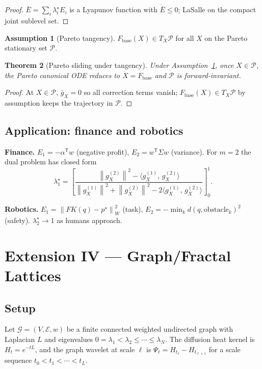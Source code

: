 \documentclass[11pt,a4paper]{article}
\newtheorem{theorem}{Theorem}[section]
\theoremstyle{definition}
\newtheorem{assumption}[theorem]{Assumption}
\newcommand{\Fbase}{F_{\mathrm{base}}}
\newcommand{\T}{^{\mathsf{T}}}
\newcommand{\norm}[1]{\left\|#1\right\|}
\newcommand{\inner}[2]{\langle #1,\,#2\rangle}
\begin{document}
\begin{proof}
$\bar E = \sum_i \lambda_i^\star E_i$ is a Lyapunov function with $\dot{\bar E} \leq 0$; LaSalle on the compact joint sublevel set.
\end{proof}

\begin{assumption}[Pareto tangency]
\label{ass:tangency}
$\Fbase(X) \in T_X \mathcal{P}$ for all $X$ on the Pareto stationary set $\mathcal{P}$.
\end{assumption}

\begin{theorem}[Pareto sliding under tangency]
\label{thm:po3}
Under Assumption~\ref{ass:tangency}, once $X \in \mathcal{P}$, the Pareto canonical ODE reduces to $\dot X = \Fbase$ and $\mathcal{P}$ is forward-invariant.
\end{theorem}

\begin{proof}
At $X \in \mathcal{P}$, $\bar g_X = 0$ so all correction terms vanish; $\Fbase(X) \in T_X \mathcal{P}$ by assumption keeps the trajectory in $\mathcal{P}$.
\end{proof}

\subsection{Application: finance and robotics}

\textbf{Finance.} $E_1 = -\alpha\T w$ (negative profit), $E_2 = w\T \Sigma w$ (variance). For $m = 2$ the dual problem has closed form
\[
\lambda_1^\star = \left[\frac{\norm{g_X^{(2)}}^2 - \inner{g_X^{(1)}}{g_X^{(2)}}}{\norm{g_X^{(1)}}^2 + \norm{g_X^{(2)}}^2 - 2\inner{g_X^{(1)}}{g_X^{(2)}}}\right]_0^1.
\]

\textbf{Robotics.} $E_1 = \norm{FK(q) - p^\star}^2_W$ (task), $E_2 = -\min_k d(q, \mathrm{obstacle}_k)^2$ (safety). $\lambda_2^\star \to 1$ as humans approach.

\newpage

\section{Extension IV --- Graph/Fractal Lattices}

\subsection{Setup}

Let $\mathcal{G} = (V, \mathcal{E}, w)$ be a finite connected weighted undirected graph with Laplacian $L$ and eigenvalues $0 = \lambda_1 < \lambda_2 \leq \cdots \leq \lambda_N$. The diffusion heat kernel is $H_t = e^{-tL}$, and the graph wavelet at scale $\ell$ is $\Psi_\ell = H_{t_\ell} - H_{t_{\ell+1}}$ for a scale sequence $t_0 < t_1 < \cdots < t_L$.
\end{document}
